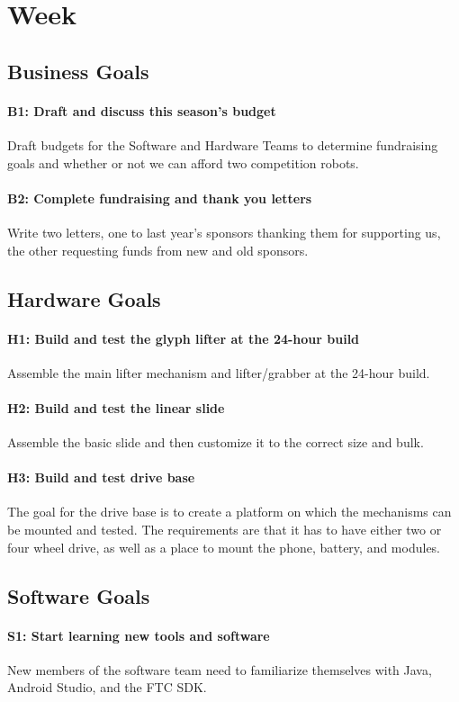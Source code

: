 \documentclass{article}
\newif\ifcontents
\begin{document}
\tableofcontents
\newpage
\contentsfalse
\clearpage \newpage \section{Week \thesection} 
\subsection{Business Goals}
\paragraph{B1: Draft and discuss this season's budget}
Draft budgets for the Software and Hardware Teams to determine fundraising goals and whether or not we can afford two competition robots.
\paragraph{B2: Complete fundraising and thank you letters}
Write two letters, one to last year's sponsors thanking them for supporting us, the other requesting funds from new and old sponsors.
\subsection{Hardware Goals}
\paragraph{H1: Build and test the glyph lifter at the 24-hour build}
Assemble the main lifter mechanism and lifter/grabber at the 24-hour build.
\paragraph{H2: Build and test the linear slide}
Assemble the basic slide and then customize it to the correct size and bulk.
\paragraph{H3: Build and test drive base}
The goal for the drive base is to create a platform on which the mechanisms can be mounted and tested. The requirements are that it has to have either two or four wheel drive, as well as a place to mount the phone, battery, and modules.
\subsection{Software Goals}
\paragraph{S1: Start learning new tools and software}
New members of the software team need to familiarize themselves with Java, Android Studio, and the FTC SDK.
\end{document}
